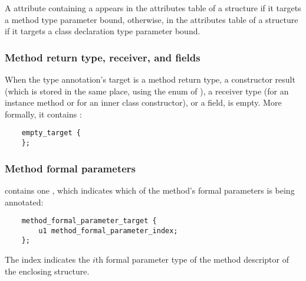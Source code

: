\documentclass[10pt]{article}
\newcommand{\preverbnegspace}{\vspace{-5pt}}
\begin{document}
A \RuntimeInOrVisibleTypeAnnotations attribute containing a
 appears in the attributes table of a
 structure if it targets a method type parameter bound,
otherwise, in the attributes table of a  structure if it
targets a class declaration type parameter bound.


\subsubsection{Method return type, receiver, and fields\label{class-file:ext:ri:return}\label{class-file:ext:ri:receiver}}

When the type annotation's target is a method return type, a constructor
result (which is stored in the same place, using the 
enum of ), a receiver type (for an instance method or for an inner class
constructor), or a field,  is empty.
More formally, it contains :

\preverbnegspace
\begin{Verbatim}
    empty_target {
    };
\end{Verbatim}



\subsubsection{Method formal parameters\label{class-file:ext:ri:formal-parameters}}

 contains one , which
indicates which of the method's formal parameters is being annotated:

\preverbnegspace
\begin{Verbatim}
    method_formal_parameter_target {
        u1 method_formal_parameter_index;
    };
\end{Verbatim}

The index indicates the $i$th formal parameter type of the method
descriptor of the enclosing  structure.

\end{document}
